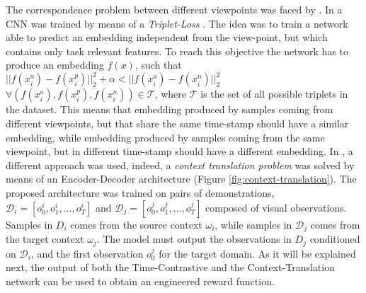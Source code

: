 
\newline The correspondence problem between different viewpoints was faced by \cite{sermanet2018time_contrastive,liu2018imitation_from_observation}. In \cite{sermanet2018time_contrastive} a CNN was trained by means of a \textit{Triplet-Loss} \cite{schroff2015triplet_loss}. The idea was to train a network able to predict an embedding independent from the view-point, but which contains only task relevant features. To reach this objective the network has to produce an embedding $f(x)$, such that $|| f(x^{a}_{i}) - f(x^{p}_{i})||^{2}_{2} + \alpha < || f(x^{a}_{i}) - f(x^{n}_{i})||^{2}_{2}$ $\forall (f(x^{a}_{i}), f(x^{p}_{i}), f(x^{n}_{i})) \in \mathcal{T}$, where $\mathcal{T}$ is the set of all possible triplets in the dataset. This means that embedding produced by samples coming from different viewpoints, but that share the same time-stamp should have a similar embedding, while embedding produced by samples coming from the same viewpoint, but in different time-stamp should have a different embedding. In \cite{liu2018imitation_from_observation}, a different approach was used, indeed, a \textit{context translation problem} was solved by means of an Encoder-Decoder architecture (Figure \ref{fig:context-translation}). The proposed architecture was trained on pairs of demonstrations, $\mathcal{D}_{i}=[o^{i}_{0},o^{i}_{1},\dots,o^{i}_{T}]$ and $\mathcal{D}_{j}=[o^{j}_{0},o^{j}_{1},\dots,o^{j}_{T}]$ composed of visual observations. Samples in $D_{i}$ comes from the source context $\omega_{i}$, while samples in $\mathcal{D}_{j}$ comes from the target context $\omega_{j}$. The model must output the observations in $D_{j}$ conditioned on $\mathcal{D}_{i}$, and the first observation $o^{j}_{0}$ for the target domain. As it will be explained next, the output of both the Time-Contrastive and the Context-Translation network can be used to obtain an engineered reward function.



